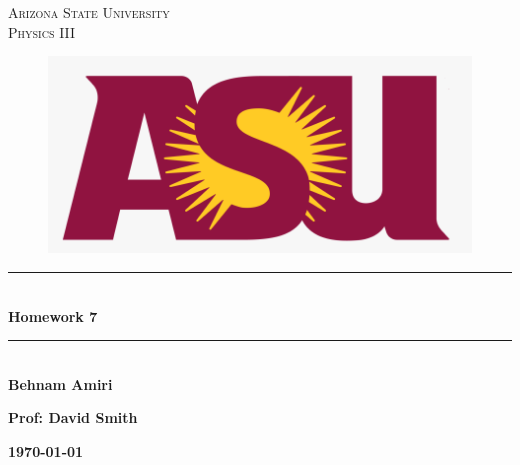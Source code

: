 \documentclass[fleqn]{article}
\begin{document}
  \begin{titlepage}

    \newcommand{\HRule}{\rule{\linewidth}{0.5mm}} %

    \center %
    


    \textsc{\LARGE Arizona State University}\\[1.5cm] %

    \textsc{\LARGE Physics III }\\[1.5cm] %


    \begin{figure}
      \includegraphics[width=\linewidth]{asu.png}
    \end{figure}


    \HRule \\[0.4cm]
    { \huge \bfseries Homework 7}\\[0.4cm] 
    \HRule \\[1.5cm]
    
    \textbf{Behnam Amiri}

    \bigbreak

    \textbf{Prof: David Smith}

    \bigbreak


    \textbf{{\large \today}\\[2cm]}

    \vfill %

  \end{titlepage}
\end{document}
